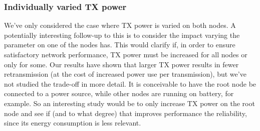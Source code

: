 \documentclass[conference]{IEEEtran}
\renewcommand\_{\textunderscore\allowbreak}
\begin{document}
\subsubsection{Individually varied TX power}
We've only considered the case where TX power is varied on both nodes. A potentially interesting follow-up to this is to consider the impact varying the parameter on one of the nodes has. This would clarify if, in order to ensure satisfactory network performance, TX power must be increased for all nodes or only for some. Our results have shown that larger TX power results in fewer retransmission (at the cost of increased power use per transmission\cite{AccurateEnergyTSCH}), but we've not studied the trade-off in more detail. It is conceivable to have the root node be connected to a power source, while other nodes are running on battery, for example. So an interesting study would be to only increase TX power on the root node and see if (and to what degree) that improves performance the reliability, since its energy consumption is less relevant. 

\printbibliography

\onecolumn
\end{document}
